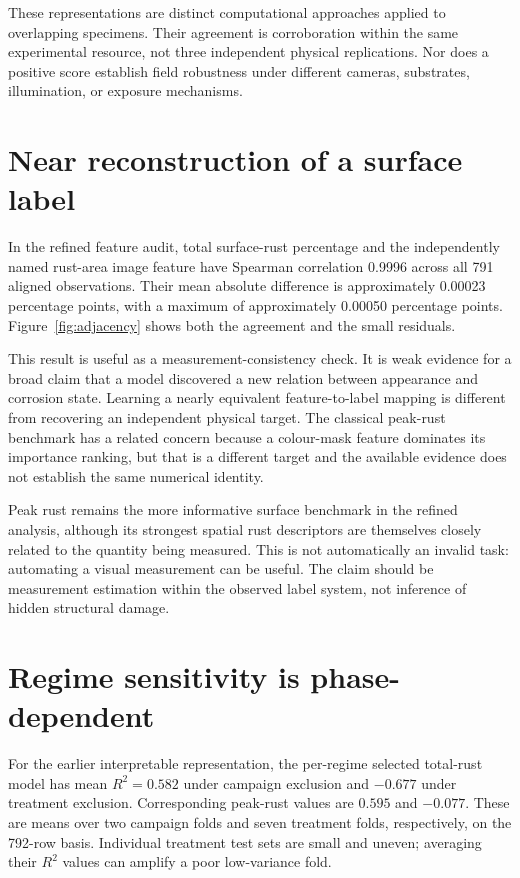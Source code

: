 These representations are distinct computational approaches applied to overlapping specimens. Their agreement is corroboration within the same experimental resource, not three independent physical replications. Nor does a positive score establish field robustness under different cameras, substrates, illumination, or exposure mechanisms.

\section{Near reconstruction of a surface label}\label{sec:adjacency}
In the refined feature audit, total surface-rust percentage and the independently named rust-area image feature have Spearman correlation 0.9996 across all 791 aligned observations. Their mean absolute difference is approximately 0.00023 percentage points, with a maximum of approximately 0.00050 percentage points. Figure~\ref{fig:adjacency} shows both the agreement and the small residuals.


This result is useful as a measurement-consistency check. It is weak evidence for a broad claim that a model discovered a new relation between appearance and corrosion state. Learning a nearly equivalent feature-to-label mapping is different from recovering an independent physical target. The classical peak-rust benchmark has a related concern because a colour-mask feature dominates its importance ranking, but that is a different target and the available evidence does not establish the same numerical identity.

Peak rust remains the more informative surface benchmark in the refined analysis, although its strongest spatial rust descriptors are themselves closely related to the quantity being measured. This is not automatically an invalid task: automating a visual measurement can be useful. The claim should be measurement estimation within the observed label system, not inference of hidden structural damage.

\section{Regime sensitivity is phase-dependent}
For the earlier interpretable representation, the per-regime selected total-rust model has mean $R^2=0.582$ under campaign exclusion and $-0.677$ under treatment exclusion. Corresponding peak-rust values are $0.595$ and $-0.077$. These are means over two campaign folds and seven treatment folds, respectively, on the 792-row basis. Individual treatment test sets are small and uneven; averaging their $R^2$ values can amplify a poor low-variance fold.

